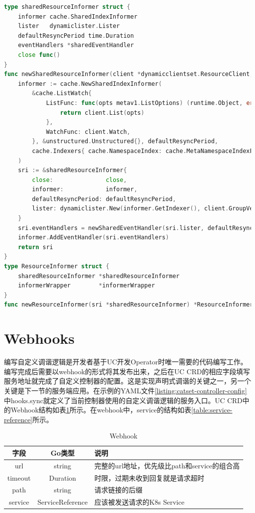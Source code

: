 \documentclass[macfonts,master]{njuthesis}
\begin{document}
\begin{lstlisting}[language=Go,caption=通知器（Informer）实现,label=listing:informer]
type sharedResourceInformer struct {
	informer cache.SharedIndexInformer
	lister   dynamiclister.Lister
	defaultResyncPeriod time.Duration
	eventHandlers *sharedEventHandler
	close func()
}
func newSharedResourceInformer(client *dynamicclientset.ResourceClient, defaultResyncPeriod time.Duration, close func()) *sharedResourceInformer {
	informer := cache.NewSharedIndexInformer(
		&cache.ListWatch{
			ListFunc: func(opts metav1.ListOptions) (runtime.Object, error) {
				return client.List(opts)
			},
			WatchFunc: client.Watch,
		}, &unstructured.Unstructured{}, defaultResyncPeriod,
		cache.Indexers{ cache.NamespaceIndex: cache.MetaNamespaceIndexFunc, },
	)
	sri := &sharedResourceInformer{
		close:               close,
		informer:            informer,
		defaultResyncPeriod: defaultResyncPeriod,
		lister: dynamiclister.New(informer.GetIndexer(), client.GroupVersionResource()),
	}
	sri.eventHandlers = newSharedEventHandler(sri.lister, defaultResyncPeriod)
	informer.AddEventHandler(sri.eventHandlers)
	return sri
}
type ResourceInformer struct {
	sharedResourceInformer *sharedResourceInformer
	informerWrapper        *informerWrapper
}
func newResourceInformer(sri *sharedResourceInformer) *ResourceInformer
\end{lstlisting}




\section{Webhooks}

编写自定义调谐逻辑是开发者基于UC开发Operator时唯一需要的代码编写工作。编写完成后需要以webhook的形式将其发布出来，之后在UC CRD的相应字段填写服务地址就完成了自定义控制器的配置。这是实现声明式调谐的关键之一，另一个关键是下一节的服务端应用。在示例的YAML文件\ref{listing:catset-controller-config}中hooks.sync就定义了当前控制器使用的自定义调谐逻辑的服务入口。UC CRD中的Webhook结构如表\ref{table:webhook}所示。在webhook中，service的结构如表\ref{table:service-reference}所示。

\begin{table}
  \centering
  \begin{tabular}{ccp{50mm}}
    \toprule
    \textbf{字段} & \textbf{Go类型} & \textbf{说明} \\
    \midrule
    url  & string  & 完整的url地址，优先级比path和service的组合高\\
    timeout  & Duration   &  时限，过期未收到回复就是请求超时 \\
    path     & string  &  请求链接的后缀 \\
    service    & ServiceReference   &  应该被发送请求的K8s Service \\
    \bottomrule
  \end{tabular}
  \caption{Webhook}\label{table:webhook}
\end{table}
\end{document}
